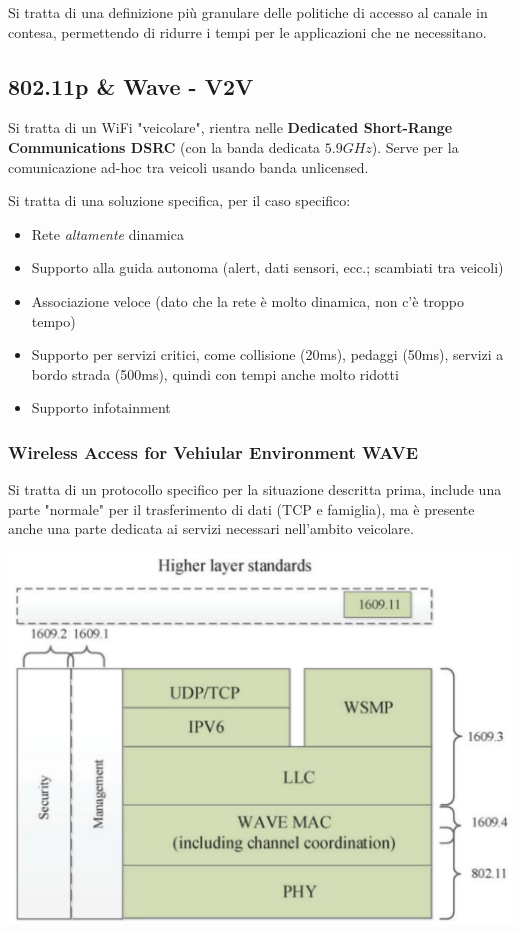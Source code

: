 Si tratta di una definizione più granulare delle politiche di accesso al canale in contesa, permettendo di ridurre i tempi per le applicazioni che ne necessitano.


\subsection{802.11p \& Wave - V2V}

Si tratta di un WiFi "veicolare", rientra nelle \textbf{Dedicated Short-Range Communications DSRC} (con la banda dedicata $5.9GHz$). Serve per la comunicazione ad-hoc tra veicoli usando banda unlicensed.

Si tratta di una soluzione specifica, per il caso specifico: 
\begin{itemize}
	\item Rete \textit{altamente} dinamica

	\item Supporto alla guida autonoma (alert, dati sensori, ecc.; scambiati tra veicoli)

	\item Associazione veloce (dato che la rete è molto dinamica, non c'è troppo tempo)

	\item Supporto per servizi critici, come collisione (20ms), pedaggi (50ms), servizi a bordo strada (500ms), quindi con tempi anche molto ridotti

	\item Supporto infotainment
\end{itemize}

\subsubsection{Wireless Access for Vehiular Environment WAVE} 

Si tratta di un protocollo specifico per la situazione descritta prima, include una parte "normale" per il trasferimento di dati (TCP e famiglia), ma è presente anche una parte dedicata ai servizi necessari nell'ambito veicolare.
\begin{center}
	\includegraphics[width=0.75\linewidth]{img/wlan/wave}
\end{center}

